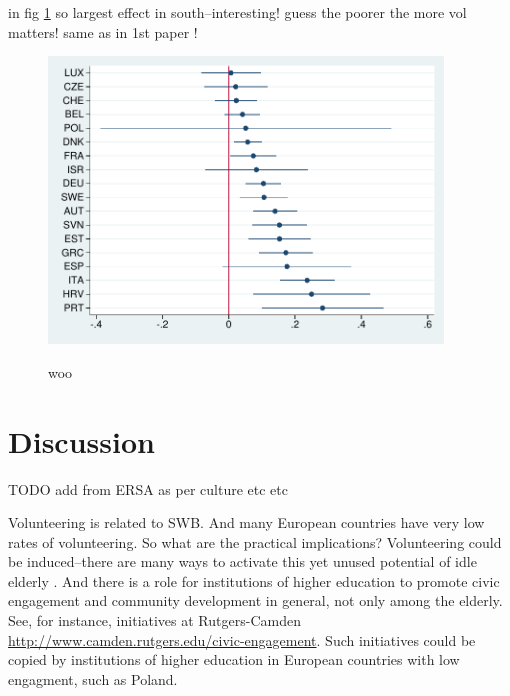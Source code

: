 \documentclass[10pt, letterpaper]{article}
\begin{document}
\begin{spacing}{1.4}
in fig \ref{reg-volCha}
so largest effect in south--interesting! guess the poorer the more vol matters!
same as in 1st paper !

\begin{figure}[H]
 \includegraphics[height=3in]{tmp/reg-volCha.pdf}\centering\label{reg-volCha}
\caption{woo}
\end{figure}


\section{Discussion}

TODO add from ERSA as per culture etc etc

Volunteering is related to SWB. And many European countries have very low rates
of volunteering. So what are the practical implications? Volunteering could be
induced--there are many ways to activate this yet unused potential of idle
elderly \citep[e.g.,][]{atkinson2006mobilizing,henkin2006communities, butler2007civic,Butts,howgate2008increasing,zedlewski2007we}. And
there is a role for institutions of higher education to promote civic engagement
and community development in general, not only among the elderly. See, for instance,
initiatives at Rutgers-Camden \url{http://www.camden.rutgers.edu/civic-engagement}.
 Such initiatives could be copied by institutions of higher education in
 European countries with low engagment, such as Poland. 


\end{spacing}
\end{document}
